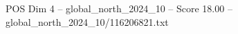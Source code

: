 \begin{textsample}{POS Dim 4 – global\_north\_2024\_10 – Score 18.00 – global\_north\_2024\_10/116206821.txt}
\end{textsample}
